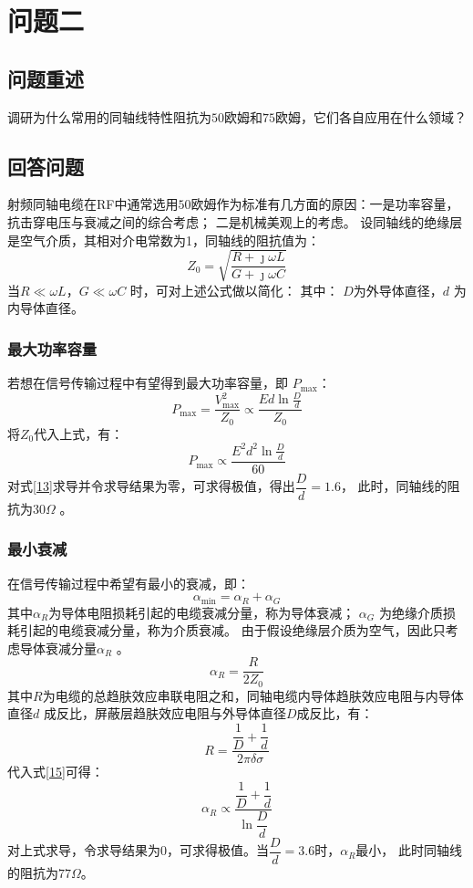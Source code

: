 \section{问题二}
\subsection{问题重述}
调研为什么常用的同轴线特性阻抗为$50$欧姆和$75$欧姆，它们各自应用在什么领域？
\subsection{回答问题}
射频同轴电缆在RF中通常选用$50$欧姆作为标准有几方面的原因：一是功率容量，抗击穿电压与衰减之间的综合考虑；
二是机械美观上的考虑。
设同轴线的绝缘层是空气介质，其相对介电常数为1，同轴线的阻抗值为：
\begin{equation}\label{10}
    Z_0=\sqrt{\frac{R+\jmath\omega L}{G+\jmath\omega C}}
\end{equation}
当$R\ll \omega L$，$G\ll \omega C$ 时，可对上述公式做以简化：
其中： $D$为外导体直径，$d$ 为内导体直径。
\subsubsection{最大功率容量}
若想在信号传输过程中有望得到最大功率容量，即 $P_{\max}$：
\begin{equation}\label{12}
    P_{\max}=\dfrac{V_{\max}^2}{Z_0}\propto \dfrac{Ed\ln\frac{D}{d}}{Z_0}
\end{equation}
将$Z_0$代入上式，有：
\begin{equation}\label{13}
    P_{\max}\propto \dfrac{E^2d^2\ln\frac{D}{d}}{60}
\end{equation}
对式\ref{13}求导并令求导结果为零，可求得极值，得出$\dfrac{D}{d}=1.6$，
此时，同轴线的阻抗为$30\Omega$ 。
\subsubsection{最小衰减}
在信号传输过程中希望有最小的衰减，即：
\begin{equation}\label{14}
    \alpha_{\min}=\alpha_R+\alpha_G
\end{equation}
其中$\alpha_R$为导体电阻损耗引起的电缆衰减分量，称为导体衰减；
$\alpha_G$ 为绝缘介质损耗引起的电缆衰减分量，称为介质衰减。
由于假设绝缘层介质为空气，因此只考虑导体衰减分量$\alpha_R$ 。
\begin{equation}\label{15}
    \alpha_R=\dfrac{R}{2Z_0}
\end{equation}
其中$R$为电缆的总趋肤效应串联电阻之和，同轴电缆内导体趋肤效应电阻与内导体直径$d$
成反比，屏蔽层趋肤效应电阻与外导体直径$D$成反比，有：
\begin{equation}\label{16}
    R=\dfrac{\dfrac{1}{D}+\dfrac{1}{d}}{2\pi\delta\sigma}
\end{equation}
代入式\ref{15}可得：
\begin{equation}
    \alpha_R\propto \dfrac{\dfrac{1}{D}+\dfrac{1}{d}}{\ln\dfrac{D}{d}}
\end{equation}
对上式求导，令求导结果为$0$，可求得极值。当$\dfrac{D}{d}=3.6$时，$\alpha_R$最小，
此时同轴线的阻抗为$77\Omega$。


